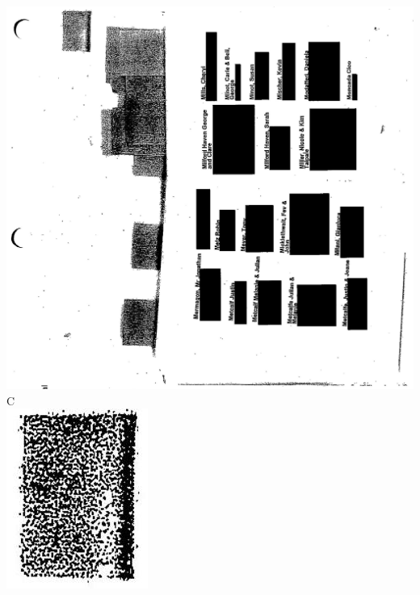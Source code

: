\documentclass[10pt]{article}
\begin{document}
\includegraphics[max width=\textwidth, center]{2025_02_27_dd68c3d38de88f0516d9g-160}\\
C\\
\includegraphics[max width=\textwidth, center]{2025_02_27_dd68c3d38de88f0516d9g-161}\\
\end{document}
